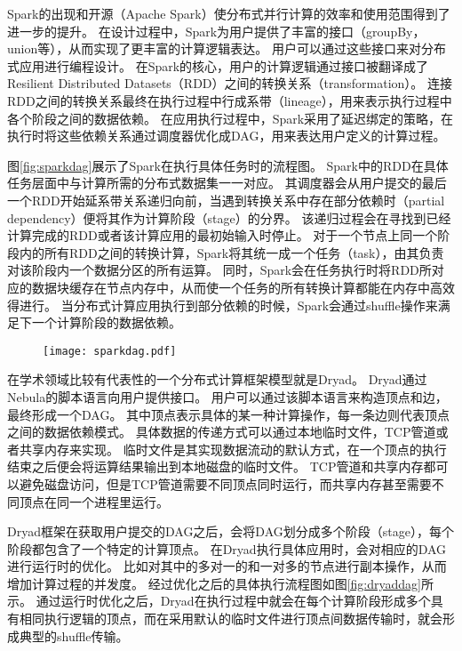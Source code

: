 Spark\cite{spark}的出现和开源（Apache Spark\cite{apachespark}）使分布式并行计算的效率和使用范围得到了进一步的提升。
在设计过程中，Spark为用户提供了丰富的接口（groupBy，union等），从而实现了更丰富的计算逻辑表达。
用户可以通过这些接口来对分布式应用进行编程设计。
在Spark的核心，用户的计算逻辑通过接口被翻译成了Resilient Distributed Datasets（RDD）之间的转换关系（transformation）。
连接RDD之间的转换关系最终在执行过程中行成系带（lineage），用来表示执行过程中各个阶段之间的数据依赖。
在应用执行过程中，Spark采用了延迟绑定的策略，在执行时将这些依赖关系通过调度器优化成DAG，用来表达用户定义的计算过程。

图\ref{fig:sparkdag}展示了Spark在执行具体任务时的流程图。
Spark中的RDD在具体任务层面中与计算所需的分布式数据集一一对应。
其调度器会从用户提交的最后一个RDD开始延系带关系递归向前，当遇到转换关系中存在部分依赖时（partial dependency）便将其作为计算阶段（stage）的分界。
该递归过程会在寻找到已经计算完成的RDD或者该计算应用的最初始输入时停止。
对于一个节点上同一个阶段内的所有RDD之间的转换计算，Spark将其统一成一个任务（task），由其负责对该阶段内一个数据分区的所有运算。
同时，Spark会在任务执行时将RDD所对应的数据块缓存在节点内存中，从而使一个任务的所有转换计算都能在内存中高效得进行。
当分布式计算应用执行到部分依赖的时候，Spark会通过shuffle操作来满足下一个计算阶段的数据依赖。

\begin{figure}[!htp]
    \centering
    \texttt{[image: sparkdag.pdf]}
\end{figure}

在学术领域比较有代表性的一个分布式计算框架模型就是Dryad\cite{dryad}。
Dryad通过Nebula的脚本语言向用户提供接口。
用户可以通过该脚本语言来构造顶点和边，最终形成一个DAG。
其中顶点表示具体的某一种计算操作，每一条边则代表顶点之间的数据依赖模式。
具体数据的传递方式可以通过本地临时文件，TCP管道或者共享内存来实现。
临时文件是其实现数据流动的默认方式，在一个顶点的执行结束之后便会将运算结果输出到本地磁盘的临时文件。
TCP管道和共享内存都可以避免磁盘访问，但是TCP管道需要不同顶点同时运行，而共享内存甚至需要不同顶点在同一个进程里运行。

Dryad框架在获取用户提交的DAG之后，会将DAG划分成多个阶段（stage），每个阶段都包含了一个特定的计算顶点。
在Dryad执行具体应用时，会对相应的DAG进行运行时的优化。
比如对其中的多对一的和一对多的节点进行副本操作，从而增加计算过程的并发度。
经过优化之后的具体执行流程图如图\ref{fig:dryaddag}所示。
通过运行时优化之后，Dryad在执行过程中就会在每个计算阶段形成多个具有相同执行逻辑的顶点，而在采用默认的临时文件进行顶点间数据传输时，就会形成典型的shuffle传输。


